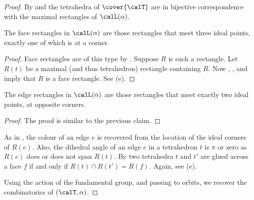 \documentclass[12pt]{amsart}
\begin{document}
\begin{proof}
By  and  the tetrahedra of $\cover{\calT}$ are in bijective correspondence with the maximal rectangles of $\calL(\alpha)$.  

\begin{claim*}
The face rectangles in $\calL(\alpha)$ are those rectangles that meet three ideal points, exactly one of which is at a corner.
\end{claim*}

\begin{proof}
Face rectangles are of this type by .  Suppose $R$ is such a rectangle.  Let $R(t)$ be a maximal (and thus tetrahedron) rectangle containing $R$.  Now , , and  imply that $R$ is a face rectangle.  See (e). 
\end{proof}

\begin{claim*}
The edge rectangles in $\calL(\alpha)$ are those rectangles that meet exactly two ideal points, at opposite corners.
\end{claim*}

\begin{proof}
The proof is similar to the previous claim.
\end{proof}

As in , the colour of an edge $e$ is recovered from the location of the ideal corners of $R(e)$. 
Also, the dihedral angle of an edge $e$ in a tetrahedron $t$ is $\pi$ or zero as $R(e)$ does or does not span $R(t)$.
By  two tetrahedra $t$ and $t'$ are glued across a face $f$ if and only if $R(t) \cap R(t') = R(f)$.  Again, see (e).

Using the action of the fundamental group, and passing to orbits, we recover the combinatorics of $(\calT, \alpha)$. 
\end{proof}
\end{document}
